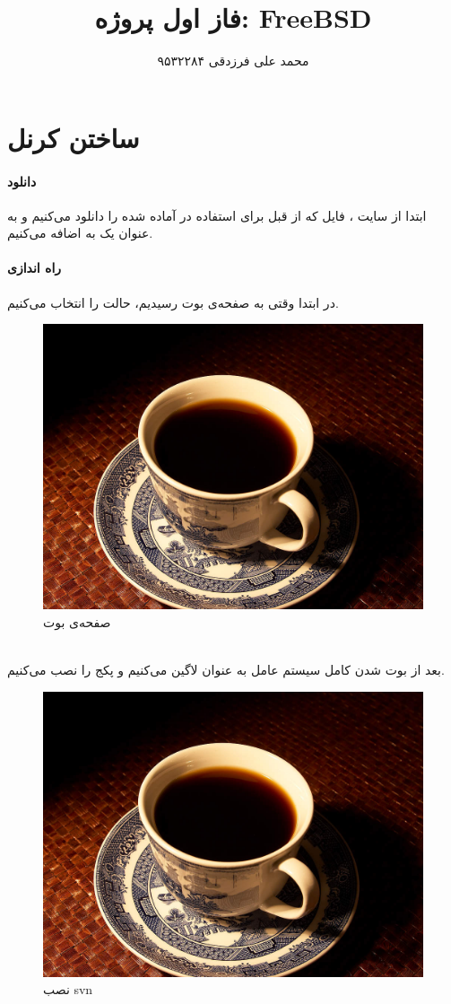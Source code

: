 \documentclass[12pt]{report}
\title{فاز اول پروژه:  FreeBSD}
\author{محمد علی فرزدقی ۹۵۳۲۲۸۴}
\begin{document}
\maketitle


\section{ساختن کرنل}
\paragraph{دانلود}
ابتدا از سایت
،
فایل
 که از قبل برای استفاده در
   آماده شده را دانلود می‌کنیم و به عنوان یک
   به
     اضافه می‌کنیم.


\paragraph{راه اندازی}
در ابتدا وقتی به صفحه‌ی بوت رسیدیم، حالت
 را انتخاب می‌کنیم.
	\begin{figure}[h!]
		\centering
		\includegraphics[width=.7\linewidth]{coffee.jpg}
		\caption{صفحه‌ی بوت}
		\label{fig:bootscreen}
	\end{figure}\\
بعد از بوت شدن کامل سیستم عامل به عنوان 
لاگین می‌کنیم و پکج 
 را نصب می‌کنیم.
	\begin{figure}[h!]
		\centering
		\includegraphics[width=.7\linewidth]{coffee.jpg}
		\caption{نصب svn}
		\label{fig:svn_inst}
	\end{figure}
	
\end{document}

